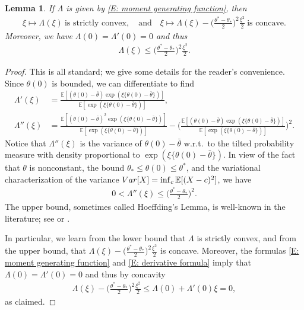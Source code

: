 \documentclass[10pt,a4paper]{amsart}
\newtheorem{lemma}{Lemma}
\newcommand{\E}{\mathbb{E}}
\begin{document}
\begin{lemma}\label{lem:properties-lambda}
	If $ \Lambda $ is given by \eqref{E: moment generating function}, then
	\begin{align*}
		\xi \mapsto \Lambda ( \xi ) ~ \text{is strictly convex},
		\quad \text{and} \quad
		\xi \mapsto \Lambda ( \xi ) - \Big( \frac{ \theta^* - \theta_* }{ 2 } \Big)^2 \frac{ \xi^2 }{ 2 } ~ \text{is concave}.
	\end{align*}
	Moreover, we have $ \Lambda ( 0 ) = \Lambda ' ( 0 ) = 0 $ and thus
	\begin{align*}
		\Lambda ( \xi ) \leq \Big( \frac{ \theta^* - \theta_* }{ 2 } \Big)^2 \frac{ \xi^2 }{ 2 } .
	\end{align*}
\end{lemma}

\begin{proof}  This is all standard; we give some details for the reader's convenience.  Since $\theta(0)$ is bounded, we can differentiate to find
	\begin{align}
		\Lambda ' (\xi) &= \frac{ \mathbb{E} [ ( \theta(0) - \bar{\theta}  ) \exp ( \xi \{ \theta(0) - \bar{\theta} \} ) ] }{ \mathbb{E} [ \exp ( \xi \{ \theta(0) - \bar{\theta} \} ) ] } , \label{E: derivative formula} \\
		\Lambda '' (\xi) &= \frac{ \mathbb{E} [ ( \theta(0) - \bar{\theta}  )^2 \exp ( \xi \{ \theta(0) - \bar{\theta} \} ) ] }{ \mathbb{E} [ \exp ( \xi \{ \theta(0) - \bar{\theta} \} ) ] } - \Big( \frac{ \mathbb{E} [ ( \theta(0) - \bar{\theta}  ) \exp ( \xi \{ \theta(0) - \bar{\theta} \} ) ]  }{ \mathbb{E} [ \exp ( \xi \{ \theta(0) - \bar{\theta} \} ) ] } \Big)^2 . \nonumber
	\end{align}
	Notice that $ \Lambda '' ( \xi ) $ is the variance of $ \theta(0) - \bar\theta $ w.r.t.~to the tilted probability measure with density proportional to $ \exp ( \xi \{ \theta(0) - \bar{\theta} \} ) $. In view of the fact that $\theta$ is nonconstant, the bound $ \theta_* \leq \theta( 0 ) \leq \theta^* $, and the variational characterization of the variance $ { \rm Var } [ X ] = \inf_{ c } \E [ ( X - c )^2 ] $, we have	
	\begin{align*}
		0 < \Lambda '' ( \xi ) \leq \Big( \frac{ \theta^* - \theta_* }{ 2 } \Big)^2 .
	\end{align*}
The upper bound, sometimes called Hoeffding's Lemma, is well-known in the literature; see \cite[Lemma 2.2]{boucheron_lugosi_massart} or \cite[Section 2.4.1]{dembo_zeitouni}.

	In particular, we learn from the lower bound that $ \Lambda $ is strictly convex, and from the upper bound, that $ \Lambda ( \xi ) -  \big( \frac{ \theta^* - \theta_* }{ 2 } \big)^2 \frac{ \xi^2 }{ 2 } $ is concave. Moreover, the formulas \eqref{E: moment generating function} and \eqref{E: derivative formula} imply that $ \Lambda ( 0 ) = \Lambda ' ( 0 ) = 0  $ and thus by concavity
	\begin{align*}
		\Lambda ( \xi ) - \Big( \frac{ \theta^* - \theta_* }{ 2 } \Big)^2 \frac{ \xi^2 }{ 2 } \leq \Lambda ( 0 ) + \Lambda ' ( 0 ) \xi = 0 ,
	\end{align*}
	as claimed.
\end{proof}
\end{document}
